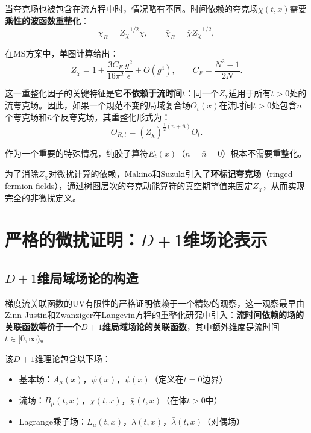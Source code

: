 \documentclass[12pt,a4paper]{ctexart}
\theoremstyle{definition}
\begin{document}
当夸克场也被包含在流方程中时，情况略有不同\cite{Luscher2013}。时间依赖的夸克场$\chi(t,x)$需要\textbf{乘性的波函数重整化}：
\begin{equation}
\chi_R = Z_\chi^{-1/2} \chi, \qquad \bar{\chi}_R = \bar{\chi} Z_\chi^{-1/2},
\label{eq:chi_renorm}
\end{equation}

在$\overline{\text{MS}}$方案中，单圈计算给出\cite{Luscher2013}：
\begin{equation}
Z_\chi = 1 + \frac{3C_F}{16\pi^2} \frac{g^2}{\epsilon} + O(g^4), \qquad C_F = \frac{N^2-1}{2N}.
\label{eq:Zchi}
\end{equation}

这一重整化因子的关键特征是它\textbf{不依赖于流时间$t$}：同一个$Z_\chi$适用于所有$t>0$处的流夸克场。因此，如果一个规范不变的局域复合场$O_t(x)$在流时间$t>0$处包含$n$个夸克场和$\bar{n}$个反夸克场，其重整化形式为\cite{Luscher2014}：
\begin{equation}
O_{R,t} = (Z_\chi)^{\frac{1}{2}(n+\bar{n})} O_t.
\label{eq:general_renorm}
\end{equation}

作为一个重要的特殊情况，纯胶子算符$E_t(x)$（$n=\bar{n}=0$）根本不需要重整化。

为了消除$Z_\chi$对微扰计算的依赖，Makino和Suzuki引入了\textbf{环标记夸克场}（ringed fermion fields）\cite{MakinoSuzuki2014}，通过树图层次的夸克动能算符的真空期望值来固定$Z_\chi$，从而实现完全的非微扰定义。

\section{严格的微扰证明：$D+1$维场论表示}\label{sec:renormalization}

\subsection{$D+1$维局域场论的构造}

梯度流关联函数的UV有限性的严格证明依赖于一个精妙的观察，这一观察最早由Zinn-Justin和Zwanziger在Langevin方程的重整化研究中引入\cite{Luscher2013,Luscher2014}：\textbf{流时间依赖的场的关联函数等价于一个$D+1$维局域场论的关联函数}，其中额外维度是流时间$t \in [0, \infty)$。

该$D+1$维理论包含以下场：
\begin{itemize}
    \item 基本场：$A_\mu(x)$，$\psi(x)$，$\bar{\psi}(x)$（定义在$t=0$边界）
    \item 流场：$B_\mu(t,x)$，$\chi(t,x)$，$\bar{\chi}(t,x)$（在体$t>0$中）
    \item Lagrange乘子场：$L_\mu(t,x)$，$\lambda(t,x)$，$\bar{\lambda}(t,x)$（对偶场）
\end{itemize}
\end{document}
